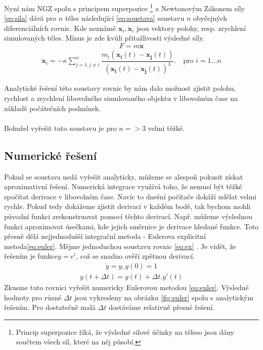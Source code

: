 Nyní nám NGZ spolu s principem superpozice
\footnote{Princip superpozice říká, že výsledné silové účinky na těleso jsou dány součtem všech sil, které na něj působí.}
 a Newtonovým Zákonem síly \eqref{eq:sila} dává pro $ n $ těles následující \eqref{eq:soustava} soustavu  $ n $ obyčejných diferenciálních rovnic. 
 Kde neznámé $ \boldsymbol {x}_i, \boldsymbol{\ddot x}_i $ jsou vektory polohy, resp. zrychlení simulovaných těles. Mínus je zde kvůli přitažlivosti výsledné síly.
\begin{equation}
F= m  \boldsymbol {\ddot x}
\label{eq:sila}
\end{equation}
\begin{align}\label{eq:soustava}
\boldsymbol {\ddot x}_i = -\kappa \sum_{j=1,j \neq i}^{n}\dfrac{m_i\left( \boldsymbol{x_i}(t) - \boldsymbol{x_j}(t)\right)}
{\left( \boldsymbol{x_i}(t) - \boldsymbol{x_j}(t)\right) ^3} . 
\quad \text{pro } i=1 \dots n
\end{align}

Analytické řešení této soustavy rovnic by nám dalo možnost zjistit polohu, rychlost a zrychlení libovolného simulovaného objektu v libovolném čase na základě počátečních podmínek.
\paragraph{}
Bohužel vyřešit tuto soustavu je pro $ n=>3 $ velmi těžké.

\subsection{Numerické řešení}
\label{sec:numReseni}
Pokud se soustava nedá vyřešit analyticky, můžeme se alespoň pokusit získat aproximativní řešení. Numerická integrace využívá toho, že nemusí být těžké spočítat derivace v libovolném čase. Navíc to dnešní počítače dokáží udělat velmi rychle. Pokud tedy dokážeme zjistit derivaci v každém bodě, tak bychom mohli původní funkci zrekonstruovat pomocí těchto derivací. Např. můžeme výslednou funkci aproximovat úsečkami, kde jejich směrnice je derivace hledané funkce. Toto přesně dělá nejjednodušší integrační metoda - Eulerova explicitní metoda\eqref{eq:euler}.
Mějme jednoduchou soustavu rovnic \eqref{eq:ex} . Je vidět, že řešením je funkce$ y=e^t $, což se snadno ověří zpětnou derivací. 
\begin{align} \label{eq:ex}
\dot	y = y, y(0)=1
\end{align}
\begin{align} \label{eq:euler}
y(t+\Delta t) = y(t) + \Delta t . y'(t)
\end{align}
Zkusme tuto rovnici vyřešit numericky Eulerovou metodou \eqref{eq:euler}. 
Výsledné hodnoty pro různé  $ \Delta t $ jsou vykresleny na obrázku \ref{fig:euler} spolu s analytickým řešením.
Pro dostatečně malá  $ \Delta t $ dostáváme relativně přesné řešení.

